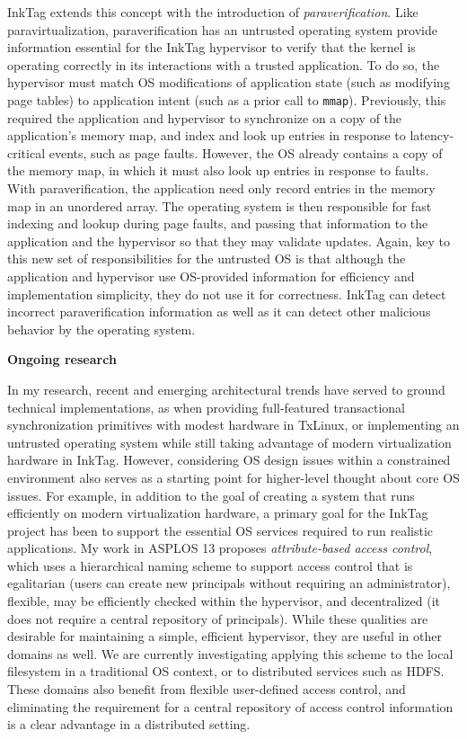 \documentclass{article}
\newcommand{\inktag}{InkTag\xspace}
\newcommand{\codeid}[1]{{\fontsize{9pt}{12pt}\tt #1}}
\begin{document}
\inktag extends this concept with the introduction of
\emph{paraverification}. Like paravirtualization, paraverification has an
untrusted operating system provide information essential for the \inktag
hypervisor to verify that the kernel is operating correctly in its
interactions with a trusted application. To do so, the hypervisor must
match OS modifications of application state (such as modifying page tables) to
application intent (such as a prior call to \codeid{mmap}). Previously, this
required the application and hypervisor to synchronize on a copy of the
application's memory map, and index and look up entries in response to
latency-critical events, such as page faults. However, the OS already
contains a copy of the memory map, in which it must also look up entries in
response to faults. With paraverification, the application need only record
entries in the memory map in an unordered array. The operating system is
then responsible for fast indexing and lookup during page faults, and
passing that information to the application and the hypervisor so that they
may validate updates. Again, key to this new set of responsibilities for
the untrusted OS is that although the application and hypervisor use
OS-provided information for efficiency and implementation simplicity, they
do not use it for correctness. \inktag can detect incorrect
paraverification information as well as it can detect other malicious
behavior by the operating system.

{\bigskip \noindent \bf Ongoing research}

\noindent
In my research, recent and emerging architectural trends have served to
ground technical implementations, as when providing full-featured
transactional synchronization primitives with modest hardware in TxLinux,
or implementing an untrusted operating system while still taking advantage
of modern virtualization hardware in \inktag. However, considering OS
design issues within a constrained environment also serves as a starting
point for higher-level thought about core OS issues. For example, in
addition to the goal of creating a system that runs efficiently on modern
virtualization hardware, a primary goal for the \inktag project has been to
support the essential OS services required to run realistic applications.
My work in ASPLOS 13 proposes \emph{attribute-based access control}, which
uses a hierarchical naming scheme to support access control that is
egalitarian (users can create new principals without requiring an
administrator), flexible, may be efficiently checked within the hypervisor,
and decentralized (it does not require a central repository of principals).
While these
qualities are desirable for maintaining a simple, efficient hypervisor,
they are useful in other domains as well. We are currently investigating
applying this scheme to the local filesystem in a traditional OS context,
or to distributed services such as HDFS. These domains also benefit from
flexible user-defined access control, and eliminating the requirement for
a central repository of access control information is a clear advantage in
a distributed setting.
\end{document}
